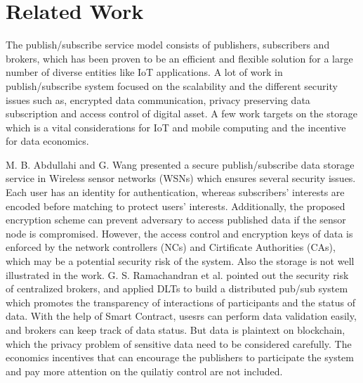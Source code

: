 \documentclass[conference]{IEEEtran}
\begin{document}
 
\section{Related Work}
The publish/subscribe service model consists of publishers, subscribers and brokers, which has been proven\cite{pubSubAnalysis, pubSubAnalysis2} to be an efficient and flexible solution for a large number of diverse entities like IoT applications. A lot of work in publish/subscribe system focused on the scalability and the different security issues such as, encrypted data communication, privacy preserving data subscription and access control of digital asset. A few work targets on the storage which is a vital considerations for IoT and mobile computing and the incentive for data economics.

M. B. Abdullahi and G. Wang\cite{centralPubSub} presented a secure publish/subscribe data storage service in Wireless sensor networks (WSNs) which ensures several security issues. Each user has an identity for authentication, whereas subscribers' interests are encoded before matching to protect users' interests. Additionally, the proposed encryption scheme can prevent adversary to access published data if the sensor node is compromised. However, the access control and encryption keys of data is enforced by the network controllers (NCs) and Cirtificate Authorities (CAs), which may be a potential security risk of the system. Also the storage is not well illustrated in the work. G. S. Ramachandran et al.\cite{trinity} pointed out the security risk of centralized brokers, and applied DLTs to build a distributed pub/sub system which promotes the transparency of interactions of participants and the status of data. With the help of Smart Contract, usesrs can perform data validation easily, and brokers can keep track of data status. But data is plaintext on blockchain, which the privacy problem of sensitive data need to be considered carefully. The economics incentives that can encourage the publishers to participate the system and pay more attention on the quilatiy control are not included. 
\end{document}
